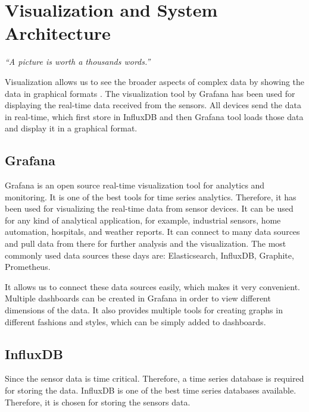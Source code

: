 \chapter{Visualization and System Architecture}


\makeatletter
\renewcommand{\@chapapp}{}%
\newenvironment{chapquote}[2][2em]
{\setlength{\@tempdima}{#1}%
	\def\chapquote@author{#2}%
	\parshape 1 \@tempdima \dimexpr{}\@tempdima\relax%
	\itshape}

\makeatother

\begin{center}
	\begin{chapquote}{}
		``A picture is worth a thousands words.''
	\end{chapquote}
\end{center}

Visualization allows us to see the broader aspects of complex data by showing the data in graphical formats \cite{quora:Sulakshana}. The visualization tool by Grafana has been used for displaying the real-time data received from the sensors. All devices send the data in real-time, which first store in InfluxDB and then Grafana tool loads those data and display it in a graphical format. 

\section{Grafana}
Grafana is an open source real-time visualization tool for analytics and monitoring. It is one of the best tools for time series analytics. Therefore, it has been used for visualizing the real-time data from sensor devices. It can be used for any kind of analytical application, for example, industrial sensors, home automation, hospitals, and weather reports. It can connect to many data sources and pull data from there for further analysis and the visualization. The most commonly used data sources these days are: Elasticsearch, InfluxDB, Graphite, Prometheus.


It allows us to connect these data sources easily, which makes it very convenient. Multiple dashboards can be created in Grafana in order to view different dimensions of the data. It also provides multiple tools for creating graphs in different fashions and styles, which can be simply added to dashboards.

\section{InfluxDB}
Since the sensor data is time critical. Therefore, a time series database is required for storing the data. InfluxDB is one of the best time series databases available. Therefore, it is chosen for storing the sensors data.

